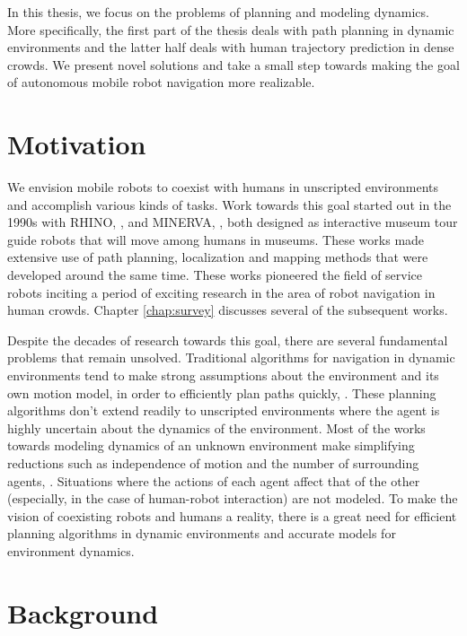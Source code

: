In this thesis, we focus on the problems of planning and modeling dynamics. More specifically, the first part of the thesis deals with  path planning in dynamic environments and the latter half deals with human trajectory prediction in dense crowds. We present novel solutions and take a small step towards making the goal of autonomous mobile robot navigation more realizable.

\section{Motivation}
\label{sec:intro-motiv-chall}

We envision mobile robots to coexist with humans in unscripted environments and accomplish various kinds of tasks. Work towards this goal started out in the 1990s with RHINO, \cite{thrun99}, and MINERVA, \cite{Thrun2000ProbabilisticAA}, both designed as interactive museum tour guide robots that will move among humans in museums. These works made extensive use of path planning, localization and mapping methods that were developed around the same time. These works pioneered the field of service robots inciting a period of exciting research in the area of robot navigation in human crowds. Chapter \ref{chap:survey} discusses several of the subsequent works.

Despite the decades of research towards this goal, there are several fundamental problems that remain unsolved. Traditional algorithms for navigation in dynamic environments tend to make strong assumptions about the environment and its own motion model, in order to efficiently plan paths quickly, \cite{lavalle2006planning, latombe2012robot}. These planning algorithms don't extend readily to unscripted environments where the agent is highly uncertain about the dynamics of the environment. Most of the works towards modeling dynamics of an unknown environment make simplifying reductions such as independence of motion and the number of surrounding agents, \cite{choset2005principles}. Situations where the actions of each agent affect that of the other (especially, in the case of human-robot interaction) are not modeled. To make the vision of coexisting robots and humans a reality, there is a great need for efficient planning algorithms in dynamic environments and accurate models for environment dynamics.

\section{Background}
\label{sec:intro-background}


